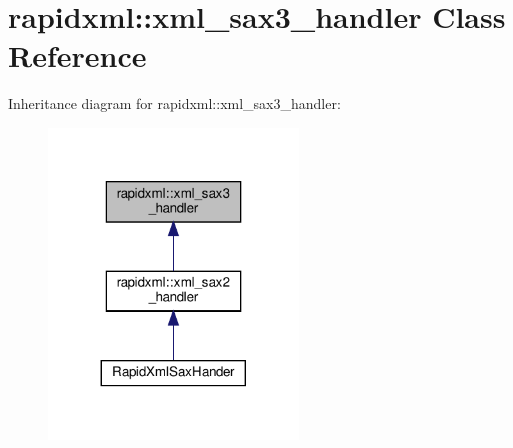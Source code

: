 \hypertarget{classrapidxml_1_1xml__sax3__handler}{}\section{rapidxml\+:\+:xml\+\_\+sax3\+\_\+handler Class Reference}
\label{classrapidxml_1_1xml__sax3__handler}


Inheritance diagram for rapidxml\+:\+:xml\+\_\+sax3\+\_\+handler\+:
\nopagebreak
\begin{figure}[H]
\begin{center}
\leavevmode
\includegraphics[width=188pt]{classrapidxml_1_1xml__sax3__handler__inherit__graph}
\end{center}
\end{figure}

